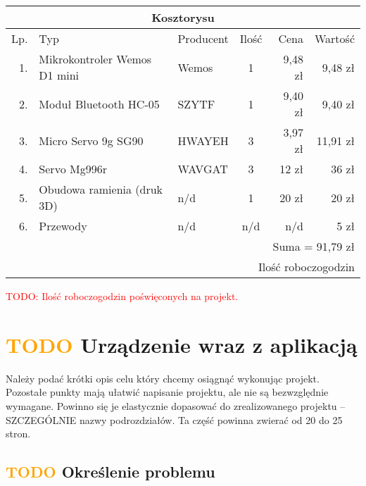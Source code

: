 \documentclass[11pt,titlepage]{article}
\begin{document}
\begin{center}
    \begin{tabular}{|r|l|l|c|r|r|}
        \hline
        \multicolumn{6}{|c|}{Kosztorysu}                                            \\
        \hline
        Lp. & Typ                          & Producent & Ilość & Cena    & Wartość  \\
        \hline
        1.  & Mikrokontroler Wemos D1 mini & Wemos     & 1     & 9,48 zł & 9,48 zł  \\
        2.  & Moduł Bluetooth HC-05        & SZYTF     & 1     & 9,40 zł & 9,40 zł  \\
        3.  & Micro Servo 9g SG90          & HWAYEH    & 3     & 3,97 zł & 11,91 zł \\
        4.  & Servo Mg996r                 & WAVGAT    & 3     & 12 zł   & 36 zł    \\
        5.  & Obudowa ramienia (druk 3D)   & n/d       & 1     & 20 zł   & 20 zł    \\
        6.  & Przewody                     & n/d       & n/d   & n/d     & 5 zł     \\
        \hline
        \multicolumn{6}{|r|}{Suma = 91,79 zł}                                       \\
        \hline
        \multicolumn{6}{|r|}{Ilość roboczogodzin}                                   \\
        \hline
    \end{tabular}
\end{center}

\textcolor{red}{TODO: Ilość roboczogodzin poświęconych na projekt.}

\section{\textcolor{orange}{TODO} Urządzenie wraz z aplikacją}

Należy podać krótki opis celu który chcemy osiągnąć wykonując projekt.
Pozostałe punkty mają ułatwić napisanie projektu, ale nie są bezwzględnie wymagane. Powinno się je elastycznie dopasować do zrealizowanego projektu – SZCZEGÓLNIE nazwy podrozdziałów.
Ta część powinna zwierać od 20 do 25 stron.

\subsection{\textcolor{orange}{TODO} Określenie problemu}
\end{document}
